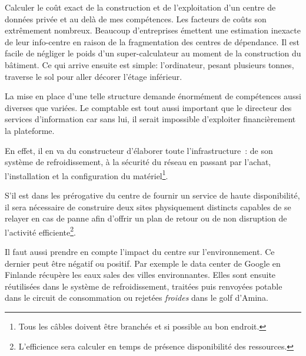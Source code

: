 \documentclass[11pt, a4paper ]{article}
\begin{document}
\begin{spacing}{1.5}



Calculer le coût exact de la construction et de l'exploitation d'un centre de données privée et au delà de mes compétences. Les facteurs de coûts son extrêmement nombreux. Beaucoup d'entreprises émettent une estimation inexacte de leur info-centre en raison de la fragmentation des centres de dépendance. Il est facile de négliger le poids d'un super-calculateur au moment de la construction du bâtiment. Ce qui arrive ensuite est simple: l'ordinateur, pesant plusieurs tonnes, traverse le sol pour aller décorer l'étage inférieur.

La mise en place d'une telle structure demande énormément de compétences aussi diverses que variées. Le comptable est tout aussi important que le directeur des services d'information car sans lui, il serait impossible d'exploiter financièrement la plateforme.

En effet, il en va du constructeur d'élaborer toute l'infrastructure : de son système de refroidissement, à la sécurité du réseau en passant par l'achat, l'installation et la configuration du matériel\footnote{Tous les câbles doivent être branchés et si possible au bon endroit.}.

S'il est dans les prérogative du centre de fournir un service de haute disponibilité, il sera nécessaire de construire deux sites physiquement distincts capables de se relayer en cas de panne afin d'offrir un plan de retour ou de non disruption de l'activité efficiente\footnote{L'efficience sera calculer en temps de présence disponibilité des ressources.}.

Il faut aussi prendre en compte l'impact du centre sur l'environnement. Ce dernier peut être négatif ou positif. Par exemple le data center de Google en Finlande récupère les eaux sales des villes environnantes. Elles sont ensuite réutilisées dans le système de refroidissement, traitées puis renvoyées potable dans le circuit de consommation ou rejetées \emph{froides} dans le golf d’Amina.


\end{spacing}
\end{document}
